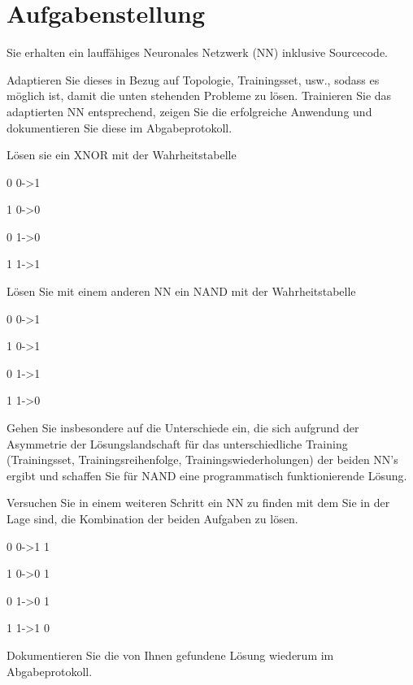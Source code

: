 \section{Aufgabenstellung}
Sie erhalten ein lauffähiges Neuronales Netzwerk (NN) inklusive Sourcecode.

Adaptieren Sie dieses in Bezug auf Topologie, Trainingsset, usw., sodass es möglich ist, damit die unten stehenden Probleme zu lösen. Trainieren Sie das adaptierten NN entsprechend, zeigen Sie die erfolgreiche Anwendung und dokumentieren Sie diese im Abgabeprotokoll.

Lösen sie ein XNOR mit der Wahrheitstabelle

0 0->1

1 0->0

0 1->0

1 1->1

Lösen Sie mit einem anderen NN ein NAND mit der Wahrheitstabelle

0 0->1

1 0->1

0 1->1

1 1->0

Gehen Sie insbesondere auf die Unterschiede ein, die sich aufgrund der Asymmetrie der Lösungslandschaft für das unterschiedliche Training (Trainingsset, Trainingsreihenfolge, Trainingswiederholungen) der beiden NN’s ergibt und schaffen Sie für NAND eine programmatisch funktionierende Lösung.

Versuchen Sie in einem weiteren Schritt ein NN zu finden mit dem Sie in der Lage sind, die Kombination der beiden Aufgaben zu lösen.

0 0->1 1

1 0->0 1

0 1->0 1

1 1->1 0

Dokumentieren Sie die von Ihnen gefundene Lösung wiederum im Abgabeprotokoll.
\clearpage
